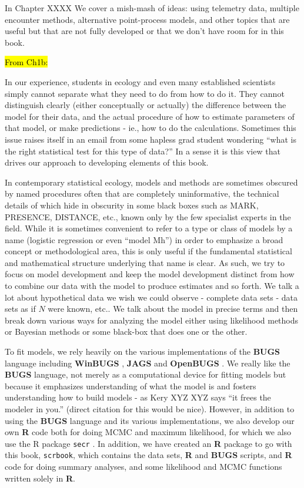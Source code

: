 In Chapter XXXX We cover a mish-mash of ideas: using telemetry data, multiple encounter methods, alternative
point-process models, and other topics that are useful but that are not fully developed or that we don't have
room for in this book.





\hl{From Ch1b:}

In our experience, students in ecology and even many established
scientists simply cannot separate what they need to do from how to do
it.  They cannot distinguish clearly (either conceptually or actually)
the difference between the model for their data, and the actual
procedure of how to estimate parameters of that model, or make
predictions - ie., how to do the calculations. Sometimes this issue
raises itself in an email from some hapless grad student wondering
``what is the right statistical test for this type of data?''  In a
sense it is this view that drives our approach to developing elements
of this book.

In contemporary statistical ecology, models and methods are sometimes
obscured by named procedures often that are completely uninformative,
the technical details of which hide in obscurity in some black boxes
such as MARK, PRESENCE, DISTANCE, etc., known only by the few
specialist experts in the field. While it is sometimes convenient to
refer to a type or class of models by a name (logistic regression or
even ``model Mh'') in order to emphasize a broad concept or
methodological area, this is only useful if the fundamental
statistical and mathematical structure underlying that name is
clear. As such, we try to focus on model development and keep the
model development distinct from how to combine our data with the model
to produce estimates and so forth. We talk a lot about hypothetical
data we wish we could observe - complete data sets - data sets as if
$N$ were known, etc.. We talk about the model in precise terms and
then break down various ways for analyzing the model either using
likelihood methods or Bayesian methods or some black-box that does one
or the other.

To fit models, we rely heavily on the various implementations of the
{\bf BUGS} language including {\bf WinBUGS} \citep{lunn_etal:2000},
{\bf JAGS} \citep{plummer:2003}
 and {\bf OpenBUGS} \citep{thomas_etal:2006}. We really like
the {\bf BUGS} language, not merely  as a computational device for
fitting models but because it emphasizes
understanding of what the model is and fosters understanding how to
build models - as Kery XYZ XYZ says ``it frees the modeler in you.''  (direct
citation for this would be nice).  However, in addition to using the
{\bf BUGS} language and its various implementations, we also develop our own
{\bf R} code both for doing MCMC
and maximum likelihood, for which we also use the R
package \mbox{\tt secr} \citep{efford:2011}. In addition, we have
created an {\bf R} package to go with this book, \mbox{\tt scrbook},
which contains the data sets, {\bf R} and {\bf BUGS} scripts, and {\bf
  R} code for doing summary analyses, and some likelihood and MCMC
functions written solely in {\bf R}.


